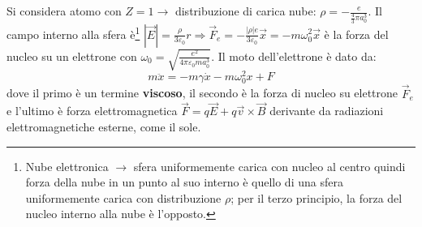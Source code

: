 \documentclass[10pt, a4paper]{scrartcl}
\numberwithin{equation}{subsection}
\theoremstyle{style1}
\begin{document}
Si considera atomo con $Z=1 \to$ distribuzione di carica nube: $\rho  = -\frac{e}{\frac{4}{3}\pi a_0^3}$. Il campo interno alla sfera \`e\footnote{Nube elettronica $\to$ sfera uniformemente carica con nucleo al centro quindi forza della nube in un punto al suo interno \`e quello di una sfera uniformemente carica con distribuzione $\rho $; per il terzo principio, la forza del nucleo interno alla nube \`e l'opposto.} $|\vec{E}| = \frac{\rho }{3\varepsilon _0}r\Rightarrow \vec{F}_e = -\frac{|\rho|  e}{3 \varepsilon _0}\vec{x}=-m\omega^2_0 \vec{x}$ \`e la forza del nucleo su un elettrone con $\omega_ 0 = \sqrt{\frac{e^2}{4\pi \varepsilon _0 m a_0^3}}$. Il moto dell'elettrone \`e dato da:
\begin{equation}
	m\ddot{x} = - m\gamma\dot{x} - m\omega_0^2 x + F
\end{equation}
dove il primo \`e un termine \textbf{viscoso}, il secondo \`e la forza di nucleo su elettrone $\vec{F}_e$ e l'ultimo \`e forza elettromagnetica $\vec{F}= q\vec{E}+q\vec{v}\times \vec{B}$ derivante da radiazioni elettromagnetiche esterne, come il sole.
\end{document}
